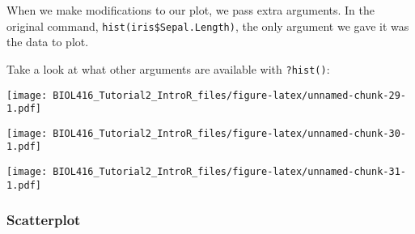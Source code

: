 \documentclass[]{article}
\newenvironment{Shaded}{\begin{snugshade}}{\end{snugshade}}
\newcommand{\KeywordTok}[1]{\textcolor[rgb]{0.13,0.29,0.53}{\textbf{#1}}}
\newcommand{\DataTypeTok}[1]{\textcolor[rgb]{0.13,0.29,0.53}{#1}}
\newcommand{\DecValTok}[1]{\textcolor[rgb]{0.00,0.00,0.81}{#1}}
\newcommand{\StringTok}[1]{\textcolor[rgb]{0.31,0.60,0.02}{#1}}
\newcommand{\CommentTok}[1]{\textcolor[rgb]{0.56,0.35,0.01}{\textit{#1}}}
\newcommand{\OperatorTok}[1]{\textcolor[rgb]{0.81,0.36,0.00}{\textbf{#1}}}
\newcommand{\AlertTok}[1]{\textcolor[rgb]{0.94,0.16,0.16}{#1}}
\newcommand{\NormalTok}[1]{#1}
\begin{document}
When we make modifications to our plot, we pass extra arguments. In the
original command, \texttt{hist(iris\$Sepal.Length)}, the only argument
we gave it was the data to plot.

Take a look at what other arguments are available with \texttt{?hist()}:

\begin{Shaded}
\end{Shaded}

\texttt{[image: BIOL416\_Tutorial2\_IntroR\_files/figure-latex/unnamed-chunk-29-1.pdf]}

\begin{Shaded}
\end{Shaded}

\texttt{[image: BIOL416\_Tutorial2\_IntroR\_files/figure-latex/unnamed-chunk-30-1.pdf]}

\begin{Shaded}
\end{Shaded}

\texttt{[image: BIOL416\_Tutorial2\_IntroR\_files/figure-latex/unnamed-chunk-31-1.pdf]}

\subsubsection{Scatterplot}\label{scatterplot}
\end{document}
